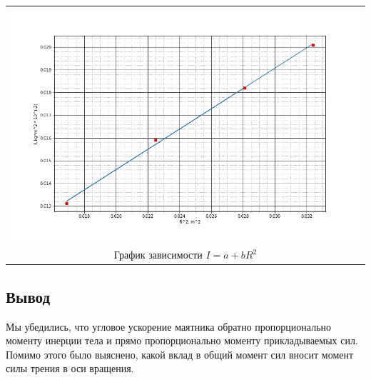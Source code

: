 \documentclass[a4paper,12pt]{article}
\begin{document}
\begin{tabular}{c}
	\includegraphics[scale=0.45]{g2.jpg} \\
	График зависимости $I = a + bR^2$ 
\end{tabular}


\newpage

\subsection*{Вывод}

Мы убедились, что угловое ускорение маятника обратно пропорционально моменту инерции тела и прямо пропорционально моменту прикладываемых сил. Помимо этого было выяснено, какой вклад в общий момент сил вносит момент силы трения в оси вращения.
\end{document}
